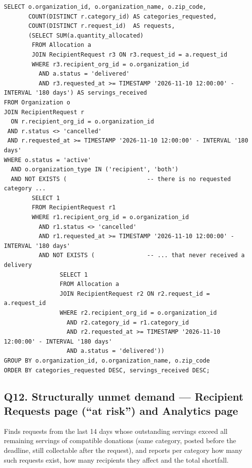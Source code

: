 \documentclass[11pt,letterpaper]{article}
\begin{document}
\begin{lstlisting}
SELECT o.organization_id, o.organization_name, o.zip_code,
       COUNT(DISTINCT r.category_id) AS categories_requested,
       COUNT(DISTINCT r.request_id)  AS requests,
       (SELECT SUM(a.quantity_allocated)
        FROM Allocation a
        JOIN RecipientRequest r3 ON r3.request_id = a.request_id
        WHERE r3.recipient_org_id = o.organization_id
          AND a.status = 'delivered'
          AND r3.requested_at >= TIMESTAMP '2026-11-10 12:00:00' - INTERVAL '180 days') AS servings_received
FROM Organization o
JOIN RecipientRequest r
  ON r.recipient_org_id = o.organization_id
 AND r.status <> 'cancelled'
 AND r.requested_at >= TIMESTAMP '2026-11-10 12:00:00' - INTERVAL '180 days'
WHERE o.status = 'active'
  AND o.organization_type IN ('recipient', 'both')
  AND NOT EXISTS (                       -- there is no requested category ...
        SELECT 1
        FROM RecipientRequest r1
        WHERE r1.recipient_org_id = o.organization_id
          AND r1.status <> 'cancelled'
          AND r1.requested_at >= TIMESTAMP '2026-11-10 12:00:00' - INTERVAL '180 days'
          AND NOT EXISTS (               -- ... that never received a delivery
                SELECT 1
                FROM Allocation a
                JOIN RecipientRequest r2 ON r2.request_id = a.request_id
                WHERE r2.recipient_org_id = o.organization_id
                  AND r2.category_id = r1.category_id
                  AND r2.requested_at >= TIMESTAMP '2026-11-10 12:00:00' - INTERVAL '180 days'
                  AND a.status = 'delivered'))
GROUP BY o.organization_id, o.organization_name, o.zip_code
ORDER BY categories_requested DESC, servings_received DESC;
\end{lstlisting}

\subsection*{Q12. Structurally unmet demand --- Recipient Requests page (``at risk'') and Analytics page}
Finds requests from the last 14 days whose outstanding servings exceed all remaining servings of compatible donations (same category, posted before the deadline, still collectable after the request), and reports per category how many such requests exist, how many recipients they affect and the total shortfall.
\end{document}
